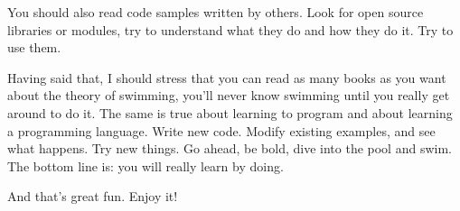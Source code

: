 You should also read code samples written by others. Look for 
open source libraries or modules, try to understand what they 
do and how they do it. Try to use them.

Having said that, I should stress that you can read as many books 
as you want about the theory of swimming, you'll never know 
swimming until you really get around to do it. The same is true 
about learning to program and about learning a programming 
language. Write new code. Modify existing examples, and see what 
happens. Try new things. Go ahead, be bold, dive into the pool and
swim. The bottom line is: you will really learn by doing.

And that's great fun. Enjoy it!

